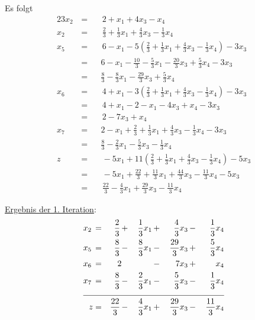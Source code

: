 \documentclass[10pt,a4paper,oneside,ngerman,numbers=noenddot]{scrartcl}
\begin{document}
		Es folgt
		\begin{alignat*}{2}
			3x_{2} \,&=&&\, 2 + x_{1} + 4x_{3} - x_{4} \\
			x_{2} \,&=&&\, \frac{2}{3} + \frac{1}{3}x_{1} + \frac{4}{3}x_{3} - \frac{1}{3}x_{4} \\
			x_{5} \,&=&&\, 6 - x_{1} - 5\left(\frac{2}{3} + \frac{1}{3}x_{1} + \frac{4}{3}x_{3} - \frac{1}{3}x_{4}\right) - 3x_{3} \\
			&=&& 6 - x_{1} - \frac{10}{3} - \frac{5}{3}x_{1} - \frac{20}{3}x_{3} + \frac{5}{3}x_{4} - 3x_{3} \\
			&=&& \frac{8}{3} - \frac{8}{3}x_{1} - \frac{29}{3}x_{3} + \frac{5}{3}x_{4} \\
			x_{6} \,&=&&\, 4 + x_{1} - 3\left(\frac{2}{3} + \frac{1}{3}x_{1} + \frac{4}{3}x_{3} - \frac{1}{3}x_{4}\right) - 3x_{3} \\
			&=&&\, 4 + x_{1} - 2 - x_{1} - 4x_{3} + x_{4} - 3x_{3} \\
			&=&&\, 2 - 7x_{3} + x_{4} \\
			x_{7} &=&& 2 - x_{1} + \frac{2}{3} + \frac{1}{3}x_{1} + \frac{4}{3}x_{3} - \frac{1}{3}x_{4} - 3x_{3} \\
			&=&& \frac{8}{3} - \frac{2}{3}x_{1} - \frac{5}{3}x_{3} - \frac{1}{3}x_{4} \\
			z \,&=&&\, - 5x_{1} + 11\left(\frac{2}{3} + \frac{1}{3}x_{1} + \frac{4}{3}x_{3} - \frac{1}{3}x_{4}\right) - 5x_{3} \\
			&=&&\, -5x_{1} + \frac{22}{3} + \frac{11}{3}x_{1} + \frac{44}{3}x_{3} - \frac{11}{3}x_{4} - 5x_{3} \\
			&=&&\, \frac{22}{3} - \frac{4}{3}x_{1} + \frac{29}{3}x_{3} - \frac{11}{3}x_{4}
		\end{alignat*}
		
		\underline{Ergebnis der 1. Iteration}:
		\begin{alignat*}{5}
			x_{2} \,&=&\, \frac{2}{3} \,&+&\, \frac{1}{3}x_{1} \,&+&\, \frac{4}{3}x_{3} \,&-&\, \frac{1}{3}x_{4} \\
			x_{5} \,&=&\, \frac{8}{3} \,&-&\, \frac{8}{3}x_{1} \,&-&\, \frac{29}{3}x_{3} \,&+&\, \frac{5}{3}x_{4} \\
			x_{6} \,&=&\, 2 && \,&-&\, 7x_{3} \,&+&\, x_{4} \\
			x_{7} \,&=&\, \frac{8}{3} \,&-&\, \frac{2}{3}x_{1} \,&-&\, \frac{5}{3}x_{3} \,&-&\, \frac{1}{3}x_{4} \\ \cline{1 - 9}
			z &=& \frac{22}{3} \,&-&\, \frac{4}{3}x_{1} \,&+&\, \frac{29}{3}x_{3} \,&-&\, \frac{11}{3}x_{4}
		\end{alignat*}
		
\end{document}
